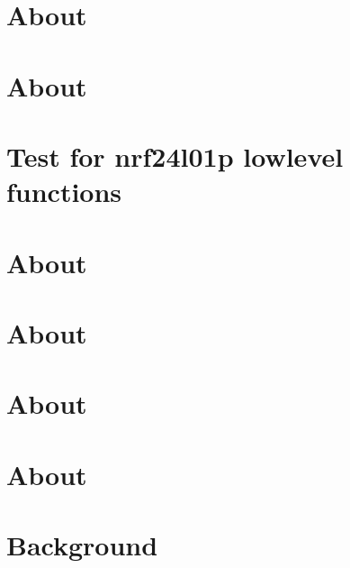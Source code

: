 \documentclass[twoside]{book}
\newcommand{\+}{\discretionary{\mbox{\scriptsize$\hookleftarrow$}}{}{}}
\begin{document}
\chapter{About}
\label{md__home_ayush_RIOT_tests_driver_mpl3115a2_README}

\chapter{About}
\label{md__home_ayush_RIOT_tests_driver_mpu9150_README}

\chapter{Test for nrf24l01p lowlevel functions}
\label{md__home_ayush_RIOT_tests_driver_nrf24l01p_lowlevel_README}

\chapter{About}
\label{md__home_ayush_RIOT_tests_driver_nvram_spi_README}

\chapter{About}
\label{md__home_ayush_RIOT_tests_driver_pcd8544_README}

\chapter{About}
\label{md__home_ayush_RIOT_tests_driver_pir_README}

\chapter{About}
\label{md__home_ayush_RIOT_tests_driver_pn532_README}

\chapter{Background}
\label{md__home_ayush_RIOT_tests_driver_servo_README}

\end{document}
